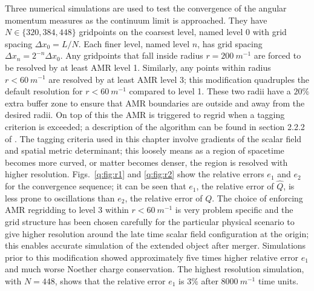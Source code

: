 Three numerical simulations are used to test the convergence of the angular momentum measures as the continuum limit is approached. They have $N\in\{320,384,448\}$ gridpoints on the coarsest level, named level $0$ with grid spacing $\Delta x_0 = L/N$. Each finer level, named level $n$, has grid spacing $\Delta x_n = 2^{-n} \Delta x_0$. Any gridpoints that fall inside radius $r= 200 ~m^{-1}$ are forced to be resolved by at least AMR level 1. Similarly, any points within radius $r<60 ~m^{-1}$ are resolved by at least AMR level 3; this modification quadruples the default resolution for $r<60 ~m^{-1}$ compared to level 1. These two radii have a $20\%$ extra buffer zone to ensure that AMR boundaries are outside and away from the desired radii. On top of this the AMR is triggered to regrid when a tagging criterion is exceeded; a description of the algorithm can be found in section 2.2.2 of \cite{Clough_2015}. The tagging criteria used in this chapter involve gradients of the scalar field and spatial metric determinant; this loosely means as a region of spacetime becomes more curved, or matter becomes denser, the region is resolved with higher resolution. Figs.~\ref{q:fig:r1} and \ref{q:fig:r2} show the relative errors $e_1$ and $e_2$ for the convergence sequence; it can be seen that $e_1$, the relative error of $\hat Q$, is less prone to oscillations than $e_2$, the relative error of $Q$. The choice of enforcing AMR regridding to level 3 within $r<60 ~m^{-1}$ is very problem specific and the grid structure has been chosen carefully for the particular physical scenario to give higher resolution around the late time scalar field configuration at the origin; this enables accurate simulation of the extended object after merger. Simulations prior to this modification showed approximately five times higher relative error $e_1$ and much worse Noether charge conservation. The highest resolution simulation, with $N=448$, shows that the relative error $e_1$ is $3\%$ after $8000 ~m^{-1}$ time units.




